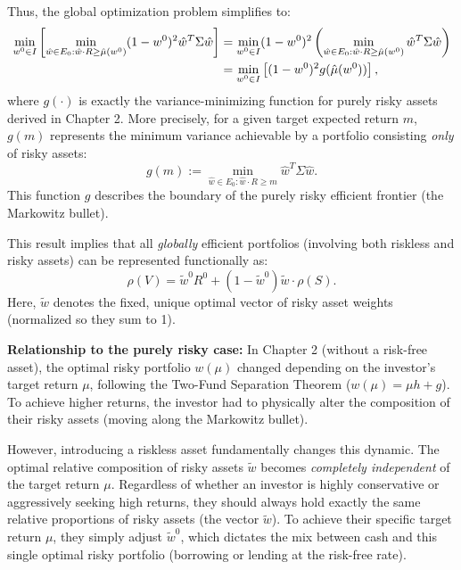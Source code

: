 Thus, the global optimization problem simplifies to:
\begin{align}
    \min_{w^0 \in I} \left[ \min_{\hat{w} \in E_0 : \hat{w} \cdot R \ge \hat{\mu}(w^0)} (1-w^0)^2 \hat{w}^T \Sigma \hat{w} \right]
    &= \min_{w^0 \in I} (1-w^0)^2 \left( \min_{\hat{w} \in E_0 : \hat{w} \cdot R \ge \hat{\mu}(w^0)} \hat{w}^T \Sigma \hat{w} \right) \notag \\
    &= \min_{w^0 \in I} \left[ (1-w^0)^2 g(\hat{\mu}(w^0)) \right],
\end{align}
where $g(\cdot)$ is exactly the variance-minimizing function for purely risky assets derived in Chapter 2. 
More precisely, for a given target expected return $m$, $g(m)$ represents the minimum variance achievable by a portfolio consisting \textit{only} of risky assets:
\begin{equation}
    g(m) := \min_{\hat{w} \in E_0 : \hat{w} \cdot R \ge m} \hat{w}^T \Sigma \hat{w}.
\end{equation}
This function $g$ describes the boundary of the purely risky efficient frontier (the Markowitz bullet).

This result implies that all \textit{globally} efficient portfolios (involving both riskless and risky assets) can be represented functionally as:
\begin{equation}
    \rho(V) = \tilde{w}^0 R^0 + (1 - \tilde{w}^0) \tilde{w} \cdot \rho(S).
\end{equation}
Here, $\tilde{w}$ denotes the fixed, unique optimal vector of risky asset weights (normalized so they sum to 1).

\textbf{Relationship to the purely risky case:} In Chapter 2 (without a risk-free asset), the optimal risky portfolio $w(\mu)$ changed depending on the investor's target return $\mu$, following the Two-Fund Separation Theorem ($w(\mu) = \mu h + g$). To achieve higher returns, the investor had to physically alter the composition of their risky assets (moving along the Markowitz bullet). 

However, introducing a riskless asset fundamentally changes this dynamic. The optimal relative composition of risky assets $\tilde{w}$ becomes \textit{completely independent} of the target return $\mu$. Regardless of whether an investor is highly conservative or aggressively seeking high returns, they should always hold exactly the same relative proportions of risky assets (the vector $\tilde{w}$). To achieve their specific target return $\mu$, they simply adjust $\tilde{w}^0$, which dictates the mix between cash and this single optimal risky portfolio (borrowing or lending at the risk-free rate).


